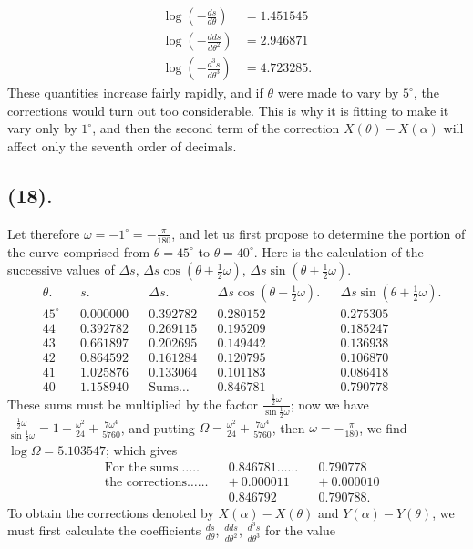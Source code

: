 \documentclass{article}
\begin{document}
\[ \begin{aligned} \log\left(-\frac{ds}{d\theta}\right)&=1.451545\\ \log\left(-\frac{dds}{d\theta^{2}}\right)&=2.946871\\ \log\left(-\frac{d^{3}s}{d\theta^{3}}\right)&=4.723285. \end{aligned} \]
These quantities increase fairly rapidly, and if $\theta$ were made to vary by $5^{\circ}$, the corrections would turn out too considerable. This is why it is fitting to make it vary only by $1^{\circ}$, and then the second term of the correction $X(\theta)-X(\alpha)$ will affect only the seventh order of decimals.

\subsection*{(18).}

Let therefore $\omega=-1^{\circ}=-\frac{\pi}{180}$, and let us first propose to determine the portion of the curve comprised from $\theta=45^{\circ}$ to $\theta=40^{\circ}$. Here is the calculation of the successive values of $\Delta s$, $\Delta s\cos(\theta+\frac{1}{2}\omega)$, $\Delta s\sin(\theta+\frac{1}{2}\omega)$.
\[ \begin{aligned} &\theta. && s. && \Delta s. && \Delta s\cos(\theta+\tfrac{1}{2}\omega). && \Delta s\sin(\theta+\tfrac{1}{2}\omega).\\ &45^{\circ} && 0.000000 && 0.392782 && 0.280152 && 0.275305\\ &44 && 0.392782 && 0.269115 && 0.195209 && 0.185247\\ &43 && 0.661897 && 0.202695 && 0.149442 && 0.136938\\ &42 && 0.864592 && 0.161284 && 0.120795 && 0.106870\\ &41 && 1.025876 && 0.133064 && 0.101183 && 0.086418\\ &40 && 1.158940 && \text{Sums}\ldots && 0.846781 && 0.790778 \end{aligned} \]
These sums must be multiplied by the factor $\frac{\frac{1}{2}\omega}{\sin\frac{1}{2}\omega}$; now we have $\frac{\frac{1}{2}\omega}{\sin\frac{1}{2}\omega}=1+\frac{\omega^{2}}{24}+\frac{7\omega^{4}}{5760}$, and putting $\Omega=\frac{\omega^{2}}{24}+\frac{7\omega^{4}}{5760}$, then $\omega=-\frac{\pi}{180}$, we find $\log\Omega=5.103547$; which gives
\[ \begin{aligned} &\text{For the sums}\ldots\ldots && 0.846781\ldots\ldots && 0.790778\\ &\text{the corrections}\ldots\ldots && +\ 0.000011 && +\ 0.000010\\ & && 0.846792 && 0.790788. \end{aligned} \]
To obtain the corrections denoted by $X(\alpha)-X(\theta)$ and $Y(\alpha)-Y(\theta)$, we must first calculate the coefficients $\frac{ds}{d\theta}$, $\frac{dds}{d\theta^{2}}$, $\frac{d^{3}s}{d\theta^{3}}$ for the value
\end{document}
